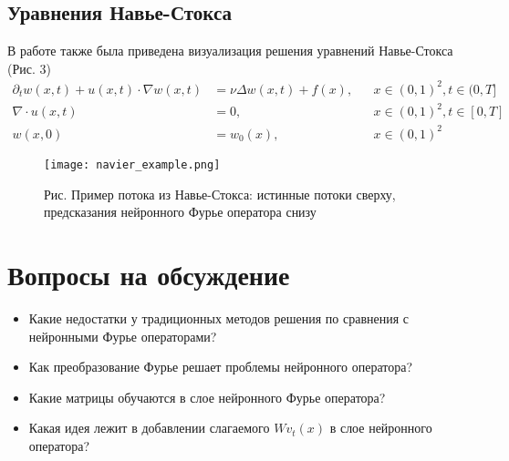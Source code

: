 \subsection{Уравнения Навье-Стокса}
В работе также была приведена визуализация решения уравнений Навье-Стокса (Рис. 3)
$$
\begin{aligned}
\partial_{t} w(x, t)+u(x, t) \cdot \nabla w(x, t) &=\nu \Delta w(x, t)+f(x), & & x \in(0,1)^{2}, t \in(0, T] \\
\nabla \cdot u(x, t) &=0, & & x \in(0,1)^{2}, t \in[0, T] \\
w(x, 0) &=w_{0}(x), & & x \in(0,1)^{2}
\end{aligned}
$$

\begin{figure}[h]
	\centering
	\texttt{[image: navier\_example.png]}
	\caption{Рис. Пример потока из Навье-Стокса: истинные потоки сверху, предсказания нейронного Фурье оператора снизу}
	\label{fig:experiment}
\end{figure}

	
\section{Вопросы на обсуждение}

	\begin{itemize}
	\item Какие недостатки у традиционных методов решения по сравнения с нейронными Фурье  операторами?
	\item Как преобразование Фурье решает проблемы нейронного оператора? 
	\item Какие матрицы обучаются в слое нейронного Фурье оператора?
	\item Какая идея лежит в добавлении слагаемого $Wv_t(x)$ в слое нейронного оператора? 
\end{itemize}